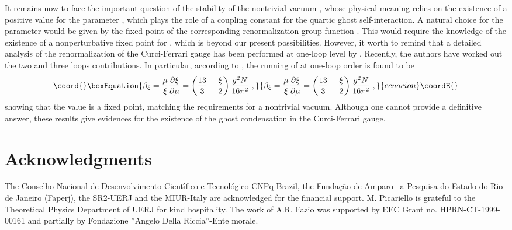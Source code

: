 \documentclass[a4paper,12pt]{article}
\begin{document}
It remains now to face the important question of the stability of the
nontrivial vacuum \myHighlight{$\left( \ref{bcff}\right) $}\coordHE{}, whose physical meaning relies
on the existence of a positive value for the parameter \myHighlight{$\xi $}\coordHE{}, which plays
the role of a coupling constant for the quartic ghost self-interaction. A
natural choice for the parameter \myHighlight{$\xi $}\coordHE{} would be given by the fixed point of
the corresponding renormalization group function \myHighlight{$\beta _{\xi }$}\coordHE{}. This would
require the knowledge of the existence of a nonperturbative fixed point for \myHighlight{$%
\xi $}\coordHE{}, which is beyond our present possibilities. However, it worth to
remind that a detailed analysis of the renormalization of the Curci-Ferrari
gauge has been performed at one-loop level by \cite{mr}. Recently, the
authors \cite{mr1} have worked out the two and three loops contributions. In
particular, according to \cite{mr,mr1}, the running of \myHighlight{$\xi $}\coordHE{} at one-loop
order is found to be 
\begin{equation}\coord{}\boxEquation{
\beta _{\xi }=\frac{\mu }{\xi }\frac{\partial \xi }{\partial \mu }=\left( 
\frac{13}{3}-\frac{\xi }{2}\right) \frac{g^{2}N}{16\pi ^{2}}\;,  \label{ba}
}{
\beta _{\xi }=\frac{\mu }{\xi }\frac{\partial \xi }{\partial \mu }=\left( 
\frac{13}{3}-\frac{\xi }{2}\right) \frac{g^{2}N}{16\pi ^{2}}\;,  }{ecuacion}\coordE{}\end{equation}
showing that the value \coordHE{} is a fixed point, matching the
requirements for a nontrivial vacuum. Although one cannot provide a
definitive answer, these results give evidences for the existence of the
ghost condensation in the Curci-Ferrari gauge.

\section*{Acknowledgments}

The Conselho Nacional de Desenvolvimento Cient\'{\i }fico e Tecnol\'{o}gico
CNPq-Brazil, the Funda{\c{c}}{\~{a}}o de Amparo {\ a Pesquisa do Estado do
Rio de Janeiro (Faperj), the SR2-UERJ and the MIUR-Italy are acknowledged
for the financial support. M. Picariello is grateful to the Theoretical
Physics Department of UERJ for kind hospitality. }The work of A.R. Fazio was
supported by EEC Grant no. HPRN-CT-1999-00161 and partially by Fondazione
''Angelo Della Riccia''-Ente morale.
\end{document}
